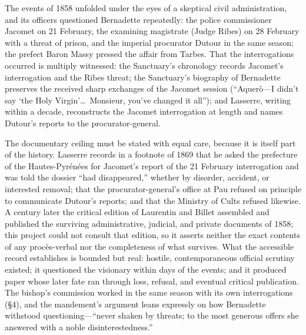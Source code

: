 The events of 1858 unfolded under the eyes of a skeptical civil
administration, and its officers questioned Bernadette repeatedly:
the police commissioner Jacomet on 21 February, the examining
magistrate (Judge Ribes) on 28 February with a threat of prison,
and the imperial procurator Dutour in the same season; the prefect
Baron Massy pressed the affair from Tarbes.
That the interrogations occurred is multiply witnessed: the
Sanctuary's chronology records Jacomet's interrogation and the
Ribes threat; the Sanctuary's biography of Bernadette preserves the
received sharp exchanges of the Jacomet session (``Aquer\`o---I
didn't say `the Holy Virgin'\ldots\ Monsieur, you've changed it
all''); and Lasserre, writing within a decade, reconstructs the
Jacomet interrogation at length and names Dutour's reports to the
procurator-general.

The documentary ceiling must be stated with equal care, because it
is itself part of the history. Lasserre records in a footnote of
1869 that he asked the prefecture of the Hautes-Pyr\'en\'ees for
Jacomet's report of the 21 February interrogation and was told the
dossier ``had disappeared,'' whether by disorder, accident, or
interested removal; that the procurator-general's office at Pau
refused on principle to communicate Dutour's reports; and that the
Ministry of Cults refused likewise. A century
later the critical edition of Laurentin and Billet assembled and
published the surviving administrative, judicial, and private
documents of 1858; this project could not consult that edition, so
it asserts neither the exact contents of any procès-verbal nor the
completeness of what survives. What the accessible record
establishes is bounded but real: hostile, contemporaneous official
scrutiny existed; it questioned the visionary within days of the
events; and it produced paper whose later fate ran through loss,
refusal, and eventual critical publication. The bishop's
commission worked in the same season with its own interrogations
(\S4), and the mandement's argument leans expressly on how
Bernadette withstood questioning---``never shaken by threats;
to the most generous offers she answered with a noble
disinterestedness.''

